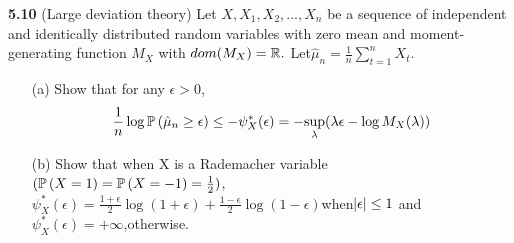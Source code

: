 \noindent\textbf{5.10} (Large deviation theory) Let $X,X_1,X_2,...,X_n$ be a sequence of independent and identically distributed random variables with zero mean and moment-generating function $M_X$ with $dom(M_X)=\mathbb{R}.$ Let$\hat{\mu}_n=\frac{1}{n}\sum_{t=1}^nX_t$.
\begin{enumerate}
    \item[(a)]Show that for any $\epsilon>0$,
        \begin{align}
            \frac{1}{n}\log\mathbb{P} \left(\hat{\mu}_n\geq\epsilon\right)\leq -\psi_X^{\ast}(\epsilon)=-\underset{\lambda}{\sup}(\lambda\epsilon-\log M_X(\lambda))
        \end{align}
    \item[(b)]Show that when X is a Rademacher variable$(\mathbb{P} \left(X=1\right)=\mathbb{P} \left(X=-1\right)=\frac{1}{2})$,$\psi_X^{\ast}(\epsilon)=\frac{1+\epsilon}{2}\log(1+\epsilon)+\frac{1-\epsilon}{2}\log(1-\epsilon)$when$\left| \epsilon \right|\le 1$ and $\psi_X^{\ast}(\epsilon)=+\infty$,otherwise.
\end{enumerate}

